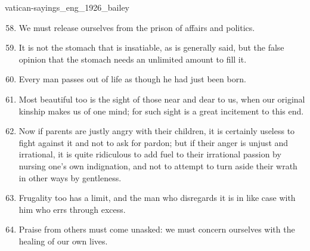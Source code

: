 \documentclass{stex}
\begin{document}
\begin{smodule}{vatican-sayings_eng_1926_bailey}
\begin{sparagraph}[id=vatican-sayings,name={Vatican Sayings}]
\begin{enumerate}[listparindent=0cm]
    \setcounter{enumi}{57}

    \item\begin{sparagraph}[id=saying:58,name=Vatican Saying 58]
      We must release ourselves from the prison of affairs and politics.
    \end{sparagraph}

    \item\begin{sparagraph}[id=saying:59,name=Vatican Saying 59]
      It is not the stomach that is insatiable, as is generally said, but the false opinion that the stomach needs an unlimited amount to fill it.
    \end{sparagraph}

    \item\begin{sparagraph}[id=saying:60,name=Vatican Saying 60]
      Every man passes out of life as though he had just been born.
    \end{sparagraph}

    \item\begin{sparagraph}[id=saying:61,name=Vatican Saying 61]
      Most beautiful too is the sight of those near and dear to us, when our original kinship makes us of one mind; for such sight is a great incitement to this end.
    \end{sparagraph}

    \item\begin{sparagraph}[id=saying:62,name=Vatican Saying 62]
      Now if parents are justly angry with their children, it is certainly useless to fight against it and not to ask for pardon; but if their anger is unjust and irrational, it is quite ridiculous to add fuel to their irrational passion by nursing one’s own indignation, and not to attempt to turn aside their wrath in other ways by gentleness.
    \end{sparagraph}

    \item\begin{sparagraph}[id=saying:63,name=Vatican Saying 63]
      Frugality too has a limit, and the man who disregards it is in like case with him who errs through excess.
    \end{sparagraph}

    \item\begin{sparagraph}[id=saying:64,name=Vatican Saying 64]
      Praise from others must come unasked: we must concern ourselves with the healing of our own lives.
    \end{sparagraph}


\end{enumerate}
\end{sparagraph}
\end{smodule}
\end{document}
